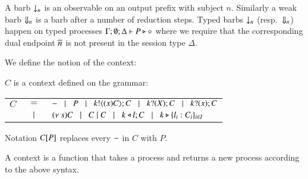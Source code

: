 A barb $\downarrow_{n}$ is an observable on an output prefix with subject $n$.
Similarly a weak barb $\Downarrow_{n}$ is a barb after a number of reduction steps.
Typed barbs $\downarrow_{n}$ (resp.\ $\Downarrow_{n}$)
happen on typed processes $\Gamma; \emptyset; \Delta \vdash P \triangleright \diamond$
where we require that the corresponding dual endpoint $\overline{n}$ is not present
in the session type $\Delta$.

We define the notion of the context:

\begin{definition}[Context]\rm
	$C$ is a context defined on the grammar:

	\begin{tabular}{rcl}
		$C$ &$=$& %
		$- \;\;\;|\;\;\; P \;\;\;|\;\;\; k ! \langle (x) C \rangle ; C \;\;\;|\;\;\; k ? (X) ; C \;\;\;|\;\;\; k ? (x) ; C$ \\
		& $\;\;\;|\;\;\;$ & $(\nu\ s) C \;\;\;|\;\;\; C \;|\; C \;\;\;|\;\;\; k \triangleleft l ; C \;\;\;|\;\;\; k \triangleright \{l_i:C_i\}_{i \in I}$
	\end{tabular}

	Notation $C[P]$ replaces every $-$ in $C$ with $P$.
\end{definition}

A context is a function that takes a process and returns a new process
according to the above syntax.


